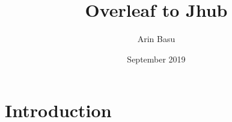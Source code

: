 \documentclass{article}
\title{Overleaf to Jhub}
\author{Arin Basu}
\date{September 2019}
\begin{document}
\maketitle

\section{Introduction}
\end{document}
